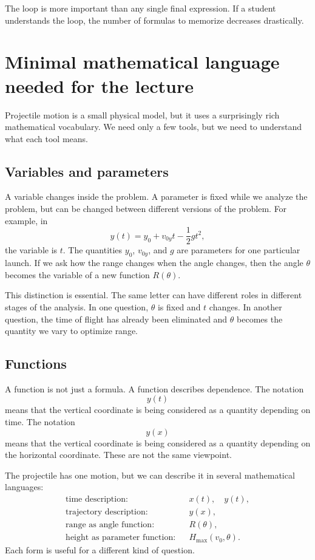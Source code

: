 \documentclass[11pt,a4paper]{article}
\begin{document}
The loop is more important than any single final expression. If a student understands the loop, the number of formulas to memorize decreases drastically.

\section{Minimal mathematical language needed for the lecture}

Projectile motion is a small physical model, but it uses a surprisingly rich mathematical vocabulary. We need only a few tools, but we need to understand what each tool means.

\subsection{Variables and parameters}

A variable changes inside the problem. A parameter is fixed while we analyze the problem, but can be changed between different versions of the problem. For example, in
\[
y(t)=y_0+v_{0y}t-\frac12gt^2,
\]
the variable is $t$. The quantities $y_0$, $v_{0y}$, and $g$ are parameters for one particular launch. If we ask how the range changes when the angle changes, then the angle $\theta$ becomes the variable of a new function $R(\theta)$.

This distinction is essential. The same letter can have different roles in different stages of the analysis. In one question, $\theta$ is fixed and $t$ changes. In another question, the time of flight has already been eliminated and $\theta$ becomes the quantity we vary to optimize range.

\subsection{Functions}

A function is not just a formula. A function describes dependence. The notation
\[
y(t)
\]
means that the vertical coordinate is being considered as a quantity depending on time. The notation
\[
y(x)
\]
means that the vertical coordinate is being considered as a quantity depending on the horizontal coordinate. These are not the same viewpoint.

The projectile has one motion, but we can describe it in several mathematical languages:
\begin{align*}
\text{time description:} && x(t),\quad y(t), \\
\text{trajectory description:} && y(x), \\
\text{range as angle function:} && R(\theta), \\
\text{height as parameter function:} && H_{\max}(v_0,\theta).
\end{align*}
Each form is useful for a different kind of question.
\end{document}
